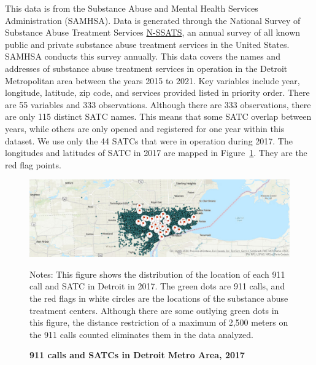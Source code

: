 \documentclass[12pt]{article}
\begin{document}
This data is from the Substance Abuse and Mental Health Services Administration (SAMHSA). Data is generated through the National Survey of Substance Abuse Treatment Services \href{https://www.samhsa.gov/data/data-we-collect/n-ssats-national-survey-substance-abuse-treatment-services}{N-SSATS}, an annual survey of all known public and private substance abuse treatment services in the United States. SAMHSA conducts this survey annually.  This data covers the names and addresses of substance abuse treatment services in operation in the Detroit Metropolitan area between the years 2015 to 2021. Key variables include year, longitude, latitude, zip code, and services provided listed in priority order. There are 55 variables and 333 observations. Although there are 333 observations, there are only 115 distinct SATC names. This means that some SATC overlap between years, while others are only opened and registered for one year within this dataset.\footnotemark[2] We use only the 44 SATCs that were in operation during 2017. The longitudes and latitudes of SATC in 2017 are mapped in Figure~\ref{fig:Figure1}. They are the red flag points. 

\begin{figure}[h!]
    \centering
\includegraphics[width=0.75\linewidth]{Reproducibility Package/Visual Graphics/ArcGIS_Map.jpg}
    \caption{\textbf{911 calls and SATCs in Detroit Metro Area, 2017}}
    \label{fig:Figure1}
     \centering\footnotesize{Notes: This figure shows the distribution of the location of each 911 call and SATC in Detroit in 2017. The green dots are 911 calls, and the red flags in white circles are the locations of the substance abuse treatment centers. Although there are some outlying green dots in this figure, the distance restriction of a maximum of 2,500 meters on the 911 calls counted eliminates them in the data analyzed.}
    
\end{figure}
\end{document}
